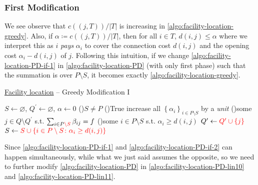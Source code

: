 \subsubsection{First Modification}
We see observe that \(c((j, T)) / \left\vert T \right\vert \) is increasing in \autoref{algo:facility-location-greedy}. Also, if \(\alpha \coloneqq c((j, T)) / \left\vert T \right\vert\), then for all \(i\in T\), \(d(i, j) \leq \alpha \) where we interpret this as \(i\) \emph{pays} \(\alpha _i\) to cover the connection cost \(d(i, j)\) and the opening cost \(\alpha _i - d(i, j)\) of \(j\). Following this intuition, if we change \autoref{algo:facility-location-PD-if-1} in \autoref{algo:facility-location-PD} (with only first phase) such that the summation is over \(P\setminus S\), it becomes exactly \autoref{algo:facility-location-greedy}.

\begin{algorithm}[H]\label{algo:facility-location-greedy-I}
	\DontPrintSemicolon
	\caption{\hyperref[prb:facility-location]{Facility location} -- Greedy Modification I}
	\BlankLine
	\(S\gets \varnothing \), \(Q^\prime \gets \varnothing \), \(\alpha \gets 0\) 
	\;
	\While(){\(S \neq P\)}{
	\While(){\textsf{True}}{
	increase all \(\left\{ \alpha _i \right\}_{i\in P\setminus S} \) by a \emph{unit}\;
	\uIf(){some \(j\in Q\setminus Q^\prime \) s.t. \(\sum_{i\in P\mathcolor{red}{\setminus S}} \beta _{ij} = f\)}{
		\Break
	}
	\ElseIf(){some \(i\in P\setminus S\) s.t. \(\alpha_i \geq d(i, j)\)}{
		\Break
	}
	}
	\(Q^\prime \gets \mathcolor{red}{Q^\prime  \cup \left\{ j \right\}}\)
	\(S\gets \mathcolor{red}{S \cup \left\{ i\in P\setminus S\colon \alpha _i \geq d(i, j)\right\} }\)
	}
	\;
\end{algorithm}

\begin{remark}
	Since \autoref{algo:facility-location-PD-if-1} and \autoref{algo:facility-location-PD-if-2} can happen simultaneously, while what we just said assumes the opposite, so we need to further modify \autoref{algo:facility-location-PD} in \autoref{algo:facility-location-PD-lin10} and \autoref{algo:facility-location-PD-lin11}.
\end{remark}

